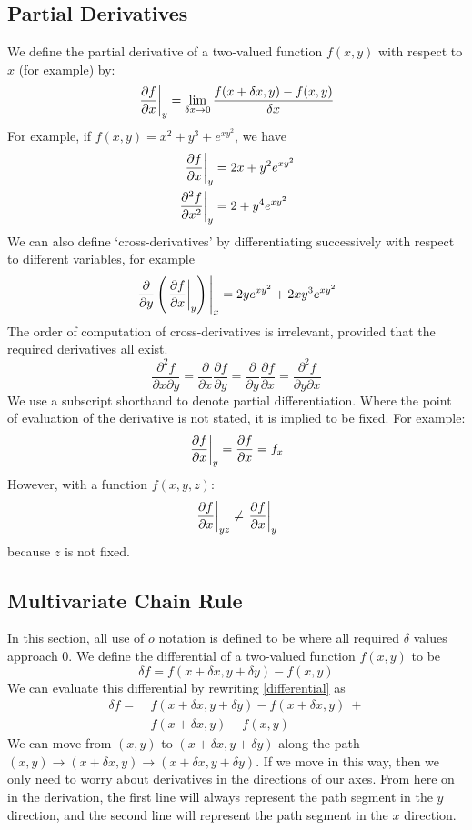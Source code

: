 \subsection{Partial Derivatives}
We define the partial derivative of a two-valued function \(f(x, y)\) with respect to \(x\) (for example) by:
\begin{equation}
	\eval{\frac{\partial f}{\partial x}}_{y} = \lim_{\delta x\to 0} \frac{f(x + \delta x, y) - f(x, y)}{\delta x}
\end{equation}
For example, if \(f(x,y) = x^2 + y^3 + e^{xy^2}\), we have
\begin{align*}
	\eval{\frac{\partial f}{\partial x}}_{y}     & = 2x + y^2 e^{xy^2} \\
	\eval{\frac{\partial^2 f}{\partial x^2}}_{y} & = 2 + y^4 e^{xy^2}
\end{align*}
We can also define `cross-derivatives' by differentiating successively with respect to different variables, for example
\[ \eval{\frac{\partial}{\partial y} \left( \eval{\frac{\partial f}{\partial x}}_{y} \right)}_{x} = 2ye^{xy^2} + 2xy^3e^{xy^2} \]
The order of computation of cross-derivatives is irrelevant, provided that the required derivatives all exist.
\begin{equation}
	\frac{\partial^2 f}{\partial x \partial y} = \frac{\partial}{\partial x}\frac{\partial f}{\partial y} = \frac{\partial}{\partial y}\frac{\partial f}{\partial x} = \frac{\partial^2 f}{\partial y \partial x}
\end{equation}
We use a subscript shorthand to denote partial differentiation. Where the point of evaluation of the derivative is not stated, it is implied to be fixed. For example:
\[ \eval{\frac{\partial f}{\partial x}}_{y} = \frac{\partial f}{\partial x} = f_x \]
However, with a function \(f(x, y, z)\):
\[ \eval{\frac{\partial f}{\partial x}}_{yz} \neq \eval{\frac{\partial f}{\partial x}}_{y} \]
because \(z\) is not fixed.

\subsection{Multivariate Chain Rule}
In this section, all use of \(o\) notation is defined to be where all required \(\delta\) values approach 0. We define the differential of a two-valued function \(f(x, y)\) to be
\begin{equation}\label{differential}
	\delta f = f(x + \delta x, y + \delta y) - f(x, y)
\end{equation}
We can evaluate this differential by rewriting \eqref{differential} as
\begin{align*}
	\delta f =\  & f(x + \delta x, y + \delta y) - f(x + \delta x, y)\ + \\
	             & f(x + \delta x, y) - f(x, y)
\end{align*}
We can move from \((x, y)\) to \((x + \delta x, y + \delta y)\) along the path \((x, y) \to (x + \delta x, y) \to (x + \delta x, y + \delta y)\). If we move in this way, then we only need to worry about derivatives in the directions of our axes. From here on in the derivation, the first line will always represent the path segment in the \(y\) direction, and the second line will represent the path segment in the \(x\) direction.

